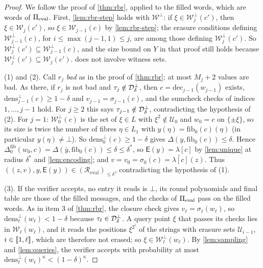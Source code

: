 \begin{proof}
We follow the proof of \cref{thm:rbr}, applied to the filled words, which are words of $\Pi_{\mathrm{eval}}$.
First, \cref{lem:rbr-step} holds with $\mathcal{W}^{\bot}$: if $\xi \in \mathcal{W}^{\bot}_j(c')$, then $\xi \in \mathcal{W}_j(c')$, so $\xi \in \mathcal{W}_{j-1}(c)$ by \cref{lem:rbr-step}; the erasure conditions defining $\mathcal{W}^{\bot}_{j-1}(c)$, for $i \le \max(j-1,1) \le j$, are among those defining $\mathcal{W}^{\bot}_{j}(c')$. So $\mathcal{W}^{\bot}_j(c') \subseteq \mathcal{W}^{\bot}_{j-1}(c)$, and the size bound on $Y$ in that proof still holds because $\mathcal{W}^{\bot}_j(c') \subseteq \mathcal{W}_j(c')$.
 does not involve witness sets.

(1) and (2). Call $r_j$ \emph{bad} as in the proof of \cref{thm:rbr}; at most $M_j + 2$ values are bad. As there, if $r_j$ is not bad and $\tau_j \notin \mathcal{D}^{\bot}_\delta$, then $c = \mathrm{dec}_{j-1}(w_{j-1})$ exists, $\mathrm{dens}^{\bot}_{j-1}(c) \ge 1-\delta$ and $v_{j-1} = \sigma_{j-1}(c)$, and the sumcheck checks of indices $1, \dots, j-1$ hold.
For $j \ge 2$ this says $\tau_{j-1} \notin \mathcal{D}^{\bot}_\delta$, contradicting the hypothesis of (2).
For $j = 1$: $\mathcal{W}^{\bot}_0(c)$ is the set of $\xi \in L$ with $\xi^2 \notin \mathcal{U}_0$ and $w_0 = c$ on $\{\pm\xi\}$, so its size is twice the number of fibres $\eta \in L_1$ with $y(\eta) = \mathrm{fib}_0(c)(\eta)$ (in particular $y(\eta) \ne \bot$). So $\mathrm{dens}^{\bot}_0(c) \ge 1-\delta$ gives $\Delta(y, \mathrm{fib}_0(c)) \le \delta$.
Hence $\Delta^{\mathrm{fib}}_0(w_0, c) = \Delta(\bar y, \mathrm{fib}_0(c)) \le \delta \le \delta^*$, so $\mathsf{E}(y) = \lambda[c]$ by \cref{lem:unique} at radius $\delta^*$ and \cref{lem:encoding}; and $v = v_0 = \sigma_0(c) = \widetilde{\lambda[c]}(z)$. Thus $((z,v), y, \mathsf{E}(y)) \in (\mathcal{R}_{\mathrm{eval}})_{\le\delta}$, contradicting the hypothesis of (1).

(3). If the verifier accepts, no entry it reads is $\bot$, its round polynomials and final table are those of the filled messages, and the checks of $\Pi_{\mathrm{eval}}$ pass on the filled words. As in item 3 of \cref{thm:rbr}, the closure check gives $v_\ell = \sigma_\ell(w_\ell)$, so $\mathrm{dens}^{\bot}_\ell(w_\ell) < 1-\delta$ because $\tau_\ell \in \mathcal{D}^{\bot}_\delta$.
A query point $\xi$ that passes its checks lies in $\mathcal{W}_\ell(w_\ell)$, and it reads the positions $\xi^{2^{i}}$ of the strings with erasure sets $\mathcal{U}_{i-1}$, $i \in \llbracket 1, \ell \rrbracket$, which are therefore not erased; so $\xi \in \mathcal{W}^{\bot}_\ell(w_\ell)$.
By \cref{lem:sampling} and \cref{lem:queries}, the verifier accepts with probability at most $\mathrm{dens}^{\bot}_\ell(w_\ell)^\kappa < (1-\delta)^\kappa$.
\end{proof}

